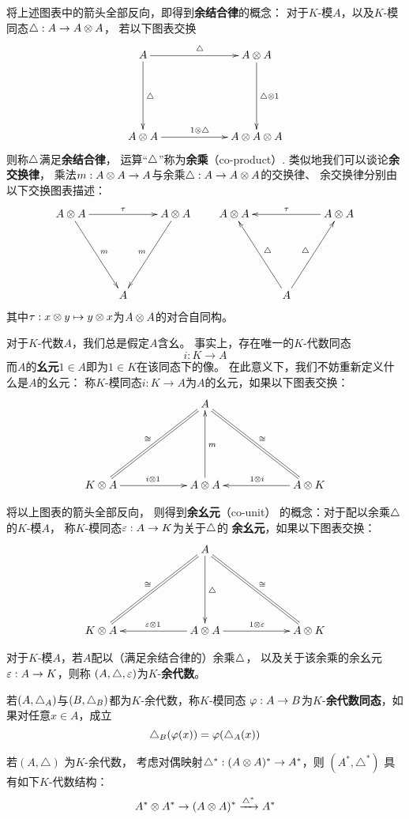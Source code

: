 将上述图表中的箭头全部反向，即得到\textbf{余结合律}的概念：
对于$K$-模$A$，以及$K$-模同态$\triangle:A\to A\otimes A$，
若以下图表交换
$$
  \xybigcol
  \xybigrow
  \xymatrix{
    A          \ar[r]^{\yc}   \ar[d]^{\yc}
   &A\ten A                   \ar[d]^{\yc\ten 1}
  \\
    A\ten A    \ar[r]^{1\ten\yc}
   &A\ten A\ten A
  }
$$
则称$\triangle$满足\textbf{余结合律}，
运算“$\triangle$”称为\textbf{余乘}（co-product）.
类似地我们可以谈论\textbf{余交换律}，
乘法$m:A\otimes A\to A$与余乘$\triangle:A\to A\otimes A$的交换律、
余交换律分别由以下交换图表描述：
$$
  \xybigrow
  \xymatrix{
    A\ten A \ar[rr]^{\tau}  \ar[dr]^m
    &&
    A\ten A \ar[dl]_{m}
  \\
    &A&
  }
\quad\quad
  \xybigrow
  \xymatrix{
    A\ten A
    &&
    A\ten A \ar[ll]_{\tau}
  \\
    &A \ar[ul]_{\yc}\ar[ur]^{\yc}
    &
  }
$$
其中$\tau: x\otimes y\mapsto y\otimes x$为$A\otimes A$的对合自同构。

对于$K$-代数$A$，我们总是假定$A$含幺。
事实上，存在唯一的$K$-代数同态
$$i:K\to A$$
而$A$的\textbf{幺元}$1\in A$即为$1\in K$在该同态下的像。
在此意义下，我们不妨重新定义什么是$A$的幺元：
称$K$-模同态$i:K\to A$为$A$的幺元，如果以下图表交换：
$$
  \xybigrow
  \xybigcol
  \xymatrix{
     &
       A\ar@{=}[ld]_{\cong}\ar@{=}[rd]^{\cong}
     &
  \\
       K\ten A  \ar[r]^{i\ten 1}
     & A\ten A  \ar[u]_{m}
     & A\ten K  \ar[l]_{1\ten i}
  }
$$

将以上图表的箭头全部反向，
则得到\textbf{余幺元}（co-unit）
的概念：对于配以余乘$\triangle$的$K$-模$A$，
称$K$-模同态$\varepsilon:A\to K$为关于$\triangle$的
\textbf{余幺元}，如果以下图表交换：
$$
  \xybigrow
  \xybigcol
  \xymatrix{
     &
       A\ar@{=}[ld]_{\cong}\ar@{=}[rd]^{\cong}\ar[d]^{\yc}
     &
  \\
       K\ten A
     & A\ten A  \ar[l]_{\veps\ten 1}\ar[r]^{1\ten \veps}
     & A\ten K
  }
$$

对于$K$-模$A$，若$A$配以（满足余结合律的）余乘$\triangle$，
以及关于该余乘的余幺元$\varepsilon:A\to K$，则称
$(A,\triangle,\varepsilon)$为$K$-\textbf{余代数}。

若$(A,\triangle_A)$与$(B,\triangle_B)$都为$K$-余代数，称$K$-模同态
$\varphi:A\to B$为$K$-\textbf{余代数同态}，如果对任意$x\in A$，成立
$$\triangle_B(\varphi(x))=\varphi(\triangle_A(x))$$

\begin{rem}%
若$(A,\triangle)$ 为$K$-余代数，%
考虑对偶映射$\triangle^*:(A\otimes A)^*\to A^*$，则
$(A^*,\triangle^*)$ %
具有如下$K$-代数结构：
$$A^*\otimes A^*\to(A\otimes A)^*\xrightarrow{\triangle^*}A^*$$
\end{rem}

